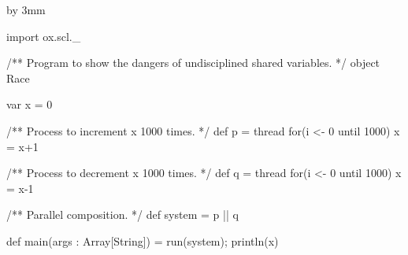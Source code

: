 \documentclass[notes,color]{sepslide0}
\begin{document}

{\advance\slideheight by 3mm
\begin{slide}

\begin{scala}
import ox.scl._

/** Program to show the dangers of undisciplined shared variables. */
object Race{
  var x = 0

  /** Process to increment x 1000 times. */
  def p = thread{ for(i <- 0 until 1000) x = x+1 }

  /** Process to decrement x 1000 times. */
  def q = thread{ for(i <- 0 until 1000) x = x-1 }

  /** Parallel composition. */
  def system = p || q

  def main(args : Array[String]) = { run(system); println(x) }
}
\end{scala}%
\end{slide}}









\end{document}
